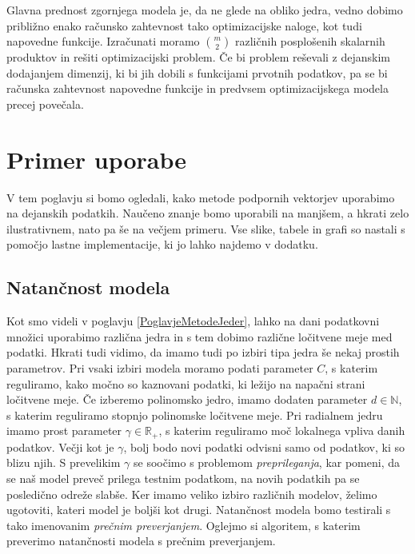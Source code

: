 \documentclass[mat1]{fmfdelo}
\newcommand{\R}{\mathbb R}
\newcommand{\N}{\mathbb N}
\begin{document}
Glavna prednost zgornjega modela je, da ne glede na obliko jedra, vedno dobimo približno enako računsko zahtevnost tako optimizacijske naloge, kot tudi napovedne funkcije. Izračunati moramo $\binom{m}{2}$ različnih posplošenih skalarnih produktov in rešiti optimizacijski problem. Če bi problem reševali z dejanskim dodajanjem dimenzij, ki bi jih dobili s funkcijami prvotnih podatkov, pa se bi računska zahtevnost napovedne funkcije in predvsem optimizacijskega modela precej povečala.  


\section{Primer uporabe}
\label{poglavjePrimerUporabe}
V tem poglavju si bomo ogledali, kako metode podpornih vektorjev uporabimo na dejanskih podatkih. Naučeno znanje bomo uporabili na manjšem, a hkrati zelo ilustrativnem, nato pa še na večjem primeru. Vse slike, tabele in grafi so nastali s pomočjo lastne implementacije, ki jo lahko najdemo v dodatku.

\subsection{Natančnost modela}
Kot smo videli v poglavju \ref{PoglavjeMetodeJeder}, lahko na dani podatkovni množici  uporabimo različna jedra in  s tem dobimo različne ločitvene meje med podatki. Hkrati tudi vidimo, da imamo tudi po izbiri tipa jedra še nekaj prostih parametrov. Pri vsaki izbiri modela moramo podati parameter $C$, s katerim reguliramo, kako močno so kaznovani podatki, ki ležijo na napačni strani ločitvene meje. Če izberemo polinomsko jedro, imamo dodaten parameter $d \in \N$, s katerim reguliramo stopnjo polinomske ločitvene meje. Pri radialnem jedru imamo prost parameter $\gamma \in \R_+$, s katerim reguliramo moč lokalnega vpliva danih podatkov. Večji kot je $\gamma$, bolj bodo novi podatki odvisni samo od podatkov, ki so blizu njih. S prevelikim $\gamma$ se soočimo s problemom \emph{preprileganja}, kar pomeni, da se naš model preveč prilega testnim podatkom, na novih podatkih pa se posledično odreže slabše. Ker imamo veliko izbiro različnih modelov, želimo ugotoviti, kateri model je boljši kot drugi. Natančnost modela bomo testirali s tako imenovanim \emph{prečnim preverjanjem}. Oglejmo si algoritem, s katerim preverimo natančnosti modela s prečnim preverjanjem.  
\end{document}
